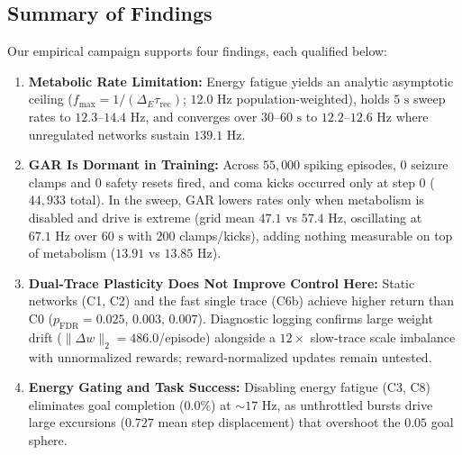\documentclass[journal]{IEEEtran}
\begin{document}
\subsection{Summary of Findings}
Our empirical campaign supports four findings, each qualified below:
\begin{enumerate}
    \item \textbf{Metabolic Rate Limitation:} Energy fatigue yields an analytic asymptotic ceiling ($f_{\max} = 1/(\Delta_E \tau_{\mathrm{rec}})$; $12.0\text{ Hz}$ population-weighted), holds $5\text{ s}$ sweep rates to $12.3\text{--}14.4\text{ Hz}$, and converges over $30\text{--}60\text{ s}$ to $12.2\text{--}12.6\text{ Hz}$ where unregulated networks sustain $139.1\text{ Hz}$.
    \item \textbf{GAR Is Dormant in Training:} Across $55{,}000$ spiking episodes, $0$ seizure clamps and $0$ safety resets fired, and coma kicks occurred only at step 0 ($44{,}933$ total). In the sweep, GAR lowers rates only when metabolism is disabled and drive is extreme (grid mean $47.1$ vs $57.4\text{ Hz}$, oscillating at $67.1\text{ Hz}$ over $60\text{ s}$ with $200$ clamps/kicks), adding nothing measurable on top of metabolism ($13.91$ vs $13.85\text{ Hz}$).
    \item \textbf{Dual-Trace Plasticity Does Not Improve Control Here:} Static networks (C1, C2) and the fast single trace (C6b) achieve higher return than C0 ($p_{\mathrm{FDR}} = 0.025$, $0.003$, $0.007$). Diagnostic logging confirms large weight drift ($\lVert \Delta w \rVert_2 = 486.0$/episode) alongside a $12\times$ slow-trace scale imbalance with unnormalized rewards; reward-normalized updates remain untested.
    \item \textbf{Energy Gating and Task Success:} Disabling energy fatigue (C3, C8) eliminates goal completion ($0.0\%$) at $\sim 17\text{ Hz}$, as unthrottled bursts drive large excursions ($0.727$ mean step displacement) that overshoot the $0.05$ goal sphere.
\end{enumerate}
\end{document}
